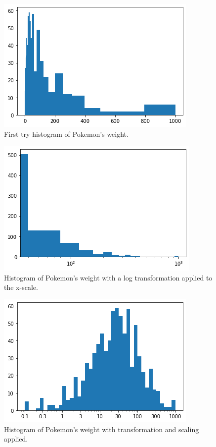 \begin{figure}
	\includegraphics{images/figure12.png}
	\caption{First try histogram of Pokemon's weight.}\label{fig:figure12}
\end{figure}

\begin{figure}
	\includegraphics{images/figure13.png}
	\caption{Histogram of Pokemon's weight with a log transformation applied to the x-scale.}\label{fig:figure13}
\end{figure}

\begin{figure}
	\includegraphics{images/figure14.png}
	\caption{Histogram of Pokemon's weight with transformation and scaling applied.}\label{fig:figure14}
\end{figure}